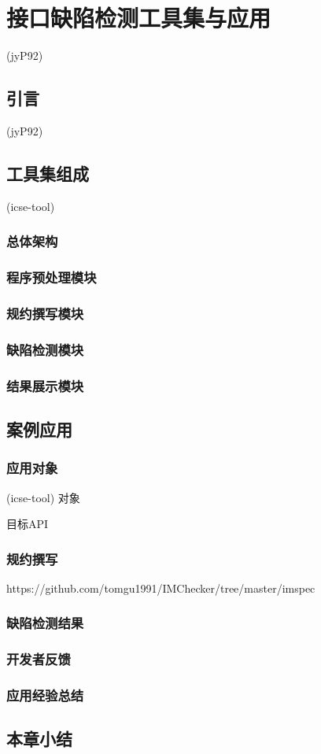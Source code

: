 \chapter{接口缺陷检测工具集与应用}
\label{cha:tools}

(jyP92)

\section{引言}
(jyP92)
\section{工具集组成}
(icse-tool)
\subsection{总体架构}
\subsection{程序预处理模块}
\subsection{规约撰写模块}
\subsection{缺陷检测模块}
\subsection{结果展示模块}

\section{案例应用}
\subsection{应用对象}
(icse-tool)
对象

目标API
\subsection{规约撰写}
https://github.com/tomgu1991/IMChecker/tree/master/imspec

\subsection{缺陷检测结果}
\subsection{开发者反馈}

\subsection{应用经验总结}

\section{本章小结}
